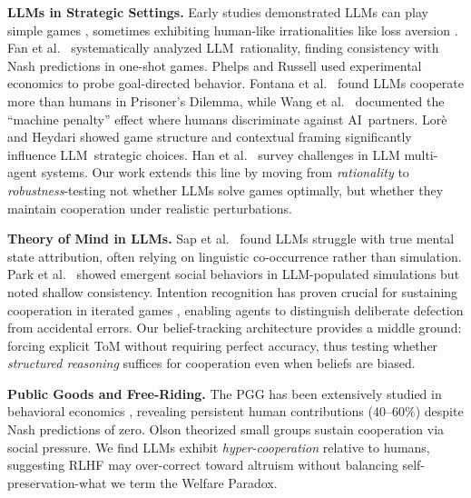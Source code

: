 \documentclass{uai2026} %
\begin{document}
\textbf{LLMs in Strategic Settings.} Early studies demonstrated LLMs can play simple games \citep{akata2023playing,brookins2023playing}, sometimes exhibiting human-like irrationalities like loss aversion \citep{horton2023large}. Fan et al.\ \citep{fan2024can} systematically analyzed LLM\ rationality, finding consistency with Nash predictions in one-shot games. Phelps and Russell \citep{phelps2023investigating} used experimental economics to probe goal-directed behavior. Fontana et al.\ \citep{fontana2024nicer} found LLMs cooperate more than humans in Prisoner's Dilemma, while Wang et al.\ \citep{wang2024large} documented the ``machine penalty'' effect where humans discriminate against AI\ partners. Lor\`e and Heydari \citep{lore2024strategic} showed game structure and contextual framing significantly influence LLM\ strategic choices. Han et al.\ \citep{han2024llm} survey challenges in LLM multi-agent systems. Our work extends this line by moving from \textit{rationality} to \textit{robustness}-testing not whether LLMs solve games optimally, but whether they maintain cooperation under realistic perturbations.

\textbf{Theory of Mind in LLMs.} Sap et al.\ \citep{sap2022neural} found LLMs struggle with true mental state attribution, often relying on linguistic co-occurrence rather than simulation. Park et al.\ \citep{park2023generative} showed emergent social behaviors in LLM-populated simulations but noted shallow consistency. Intention recognition has proven crucial for sustaining cooperation in iterated games \citep{han2012alife,distefano2023intention,inferenceStrategies}, enabling agents to distinguish deliberate defection from accidental errors. Our belief-tracking architecture provides a middle ground: forcing explicit ToM without requiring perfect accuracy, thus testing whether \textit{structured reasoning} suffices for cooperation even when beliefs are biased.

\textbf{Public Goods and Free-Riding.} The PGG has been extensively studied in behavioral economics \citep{fehr2000cooperation,ledyard1995public}, revealing persistent human contributions (40--60\%) despite Nash predictions of zero. Olson \citep{olson1965logic} theorized small groups sustain cooperation via social pressure. We find LLMs exhibit \textit{hyper-cooperation} relative to humans, suggesting RLHF \citep{ouyang2022training} may over-correct toward altruism without balancing self-preservation-what we term the Welfare Paradox.
\end{document}
